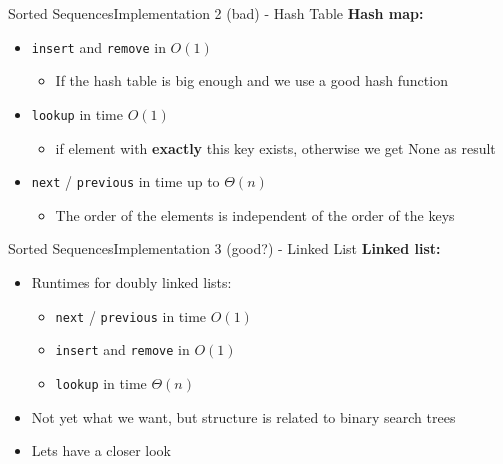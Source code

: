 \begin{frame}{Sorted Sequences}{Implementation 2 (bad) - Hash Table}
  \textbf{Hash map:}
  \begin{itemize}
    \item<2->
      {\color{Mittel-Blau}\texttt{insert}} and
      {\color{Mittel-Blau}\texttt{remove}} in $O(1)$\\
      \begin{itemize}
        \item<3-> If the hash table is big enough and we use a good hash function
      \end{itemize}  
    \item<4->
      {\color{Mittel-Blau}\texttt{lookup}} in time $O(1)$ 
      \begin{itemize}
        \item<5-> if element with \textbf{exactly}
      this key exists, otherwise we get {\color{Mittel-Blau}None} as result
      \end{itemize}    
    \item<5->
      {\color{Mittel-Blau}\texttt{next}} /
      {\color{Mittel-Blau}\texttt{previous}} in time up to $\Theta(n)$\\
       \begin{itemize}
        \item<6->
          The order of the elements is independent of the order of the keys
       \end{itemize}     
  \end{itemize}
\end{frame}


\begin{frame}{Sorted Sequences}{Implementation 3 (good?) - Linked List}
  \textbf{Linked list:}
  \begin{itemize}
  \item<2-> Runtimes for doubly linked lists:
    \begin{itemize}
    \item<3->
      {\color{Mittel-Blau}\texttt{next}} /
      {\color{Mittel-Blau}\texttt{previous}} in time $O(1)$\\
    \item<4->
      {\color{Mittel-Blau}\texttt{insert}} and
      {\color{Mittel-Blau}\texttt{remove}} in $O(1)$
    \item<5->
      {\color{Mittel-Blau}\texttt{lookup}} in time $\Theta(n)$\\
    \end{itemize}
  \item<6-> Not yet what we want, but structure is related
    to binary search trees
  \item<7->Lets have a closer look
  \end{itemize}
\end{frame}
